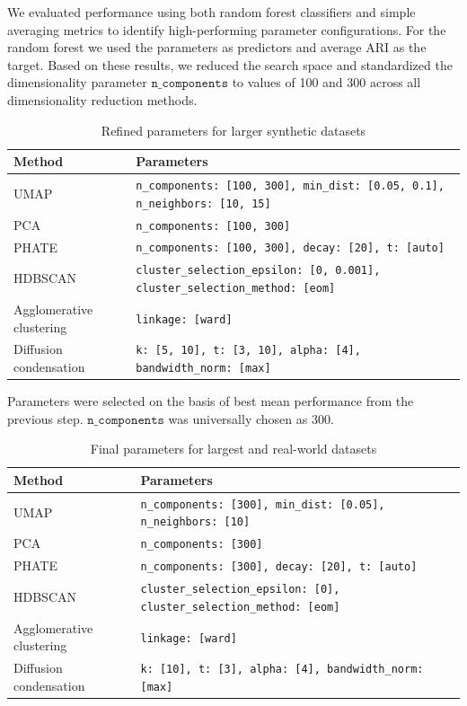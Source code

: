 We evaluated performance using both random forest classifiers and simple averaging metrics to identify high-performing parameter configurations. For the random forest we used the parameters as predictors and average ARI as the target. Based on these results, we reduced the search space and standardized the dimensionality parameter $\mathtt{n\_components}$ to values of 100 and 300 across all dimensionality reduction methods.
\begin{table}[ht]
\centering
\caption{Refined parameters for larger synthetic datasets}
\begin{tabular}{@{}lp{10cm}@{}}
\toprule
\textbf{Method} & \textbf{Parameters} \\ \midrule
UMAP & \texttt{n\_components: [100, 300], min\_dist: [0.05, 0.1], n\_neighbors: [10, 15]} \\ \midrule
PCA & \texttt{n\_components: [100, 300]} \\ \midrule
PHATE & \texttt{n\_components: [100, 300], decay: [20], t: [auto]} \\ \midrule
HDBSCAN & \texttt{cluster\_selection\_epsilon: [0, 0.001], cluster\_selection\_method: [eom]} \\ \midrule
Agglomerative clustering & \texttt{linkage: [ward]} \\ \midrule
Diffusion condensation & \texttt{k: [5, 10], t: [3, 10], alpha: [4], bandwidth\_norm: [max]} \\ 
\bottomrule
\end{tabular}
\end{table}

Parameters were selected on the basis of best mean performance from the previous step. $\mathtt{n\_components}$ was universally chosen as 300.  
\begin{table}[ht]
\centering
\caption{Final parameters for largest and real-world datasets}
\begin{tabular}{@{}lp{10cm}@{}}
\toprule
\textbf{Method} & \textbf{Parameters} \\ \midrule
UMAP & \texttt{n\_components: [300], min\_dist: [0.05], n\_neighbors: [10]} \\ \midrule
PCA & \texttt{n\_components: [300]} \\ \midrule
PHATE & \texttt{n\_components: [300], decay: [20], t: [auto]} \\ \midrule
HDBSCAN & \texttt{cluster\_selection\_epsilon: [0], cluster\_selection\_method: [eom]} \\ \midrule
Agglomerative clustering & \texttt{linkage: [ward]} \\ \midrule
Diffusion condensation & \texttt{k: [10], t: [3], alpha: [4], bandwidth\_norm: [max]} \\
\bottomrule
\end{tabular}
\label{tab:final-parameters}
\end{table}

